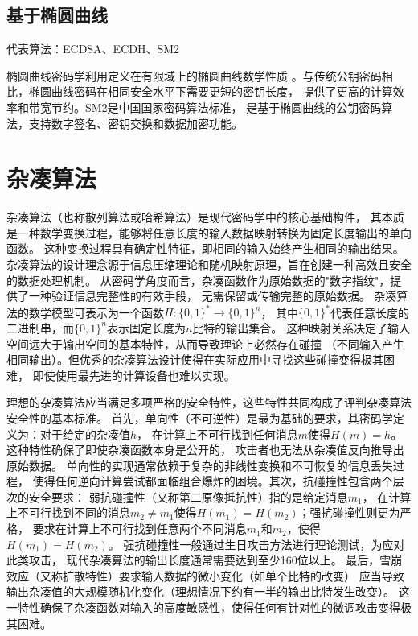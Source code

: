 \subsection{基于椭圆曲线}
代表算法：ECDSA、ECDH、SM2

椭圆曲线密码学利用定义在有限域上的椭圆曲线数学性质
。与传统公钥密码相比，椭圆曲线密码在相同安全水平下需要更短的密钥长度，
提供了更高的计算效率和带宽节约。SM2是中国国家密码算法标准，
是基于椭圆曲线的公钥密码算法，支持数字签名、密钥交换和数据加密功能。

\section{杂凑算法}
杂凑算法（也称散列算法或哈希算法）是现代密码学中的核心基础构件，
其本质是一种数学变换过程，能够将任意长度的输入数据映射转换为固定长度输出的单向函数。
这种变换过程具有确定性特征，即相同的输入始终产生相同的输出结果。
杂凑算法的设计理念源于信息压缩理论和随机映射原理，旨在创建一种高效且安全的数据处理机制。
从密码学角度而言，杂凑函数作为原始数据的"数字指纹"，提供了一种验证信息完整性的有效手段，
无需保留或传输完整的原始数据。
杂凑算法的数学模型可表示为一个函数$H: \{0,1\}^* \rightarrow \{0,1\}^n$，
其中$\{0,1\}^*$代表任意长度的二进制串，而$\{0,1\}^n$表示固定长度为$n$比特的输出集合。
这种映射关系决定了输入空间远大于输出空间的基本特性，从而导致理论上必然存在碰撞
（不同输入产生相同输出）。但优秀的杂凑算法设计使得在实际应用中寻找这些碰撞变得极其困难，
即使使用最先进的计算设备也难以实现。

理想的杂凑算法应当满足多项严格的安全特性，这些特性共同构成了评判杂凑算法安全性的基本标准。
首先，单向性（不可逆性）是最为基础的要求，其密码学定义为：对于给定的杂凑值$h$，
在计算上不可行找到任何消息$m$使得$H(m) = h$。这种特性确保了即使杂凑函数本身是公开的，
攻击者也无法从杂凑值反向推导出原始数据。
单向性的实现通常依赖于复杂的非线性变换和不可恢复的信息丢失过程，
使得任何逆向计算尝试都面临组合爆炸的困境。其次，抗碰撞性包含两个层次的安全要求：
弱抗碰撞性（又称第二原像抵抗性）指的是给定消息$m_1$，
在计算上不可行找到不同的消息$m_2 \neq m_1$使得$H(m_1) = H(m_2)$；强抗碰撞性则更为严格，
要求在计算上不可行找到任意两个不同消息$m_1$和$m_2$，使得$H(m_1) = H(m_2)$。
强抗碰撞性一般通过生日攻击方法进行理论测试，为应对此类攻击，
现代杂凑算法的输出长度通常需要达到至少160位以上。
最后，雪崩效应（又称扩散特性）要求输入数据的微小变化（如单个比特的改变）
应当导致输出杂凑值的大规模随机化变化（理想情况下约有一半的输出比特发生改变）。
这一特性确保了杂凑函数对输入的高度敏感性，使得任何有针对性的微调攻击变得极其困难。

